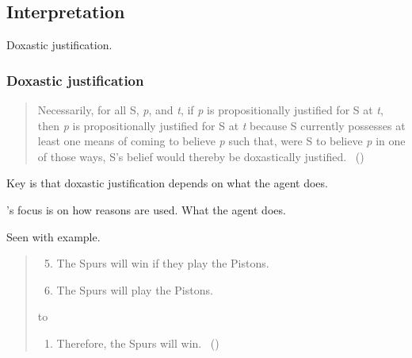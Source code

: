 \subsection{Interpretation}
\label{cha:zSpA:sec:interpretation}

\begin{note}
  Doxastic justification.
\end{note}



\subsubsection{Doxastic justification}
\label{cha:fcs:sec:dox-just}

\begin{note}
  \citeauthor{Turri:2010aa}

  \begin{quote}
    Necessarily, for all S, \emph{p}, and \emph{t}, if \emph{p} is propositionally justified for S at \emph{t}, then \emph{p} is propositionally justified for S at \emph{t} because S currently possesses at least one means of coming to believe \emph{p} such that, were S to believe \emph{p} in one of those ways, S's belief would thereby be doxastically justified.%
    \mbox{ }\hfill\mbox{(\citeyear[316]{Turri:2010aa})}
  \end{quote}

  Key is that doxastic justification depends on what the agent does.

  \citeauthor{Turri:2010aa}'s focus is on how reasons are used.
  What the agent does.

  Seen with example.

  \begin{quote}
    \begin{enumerate}[label=(P\arabic*)]
      \setcounter{enumi}{4}
    \item
      The Spurs will win if they play the Pistons.
    \item
      The Spurs will play the Pistons.
    \end{enumerate}

    \hbox to \hsize{\hfil{\vdots}\hfil}

    \begin{enumerate}[label=(P\arabic*), resume]
    \item
      Therefore, the Spurs will win.%
    \mbox{ }\hfill\mbox{(\citeyear[317]{Turri:2010aa})}
    \end{enumerate}
  \end{quote}


\end{note}
